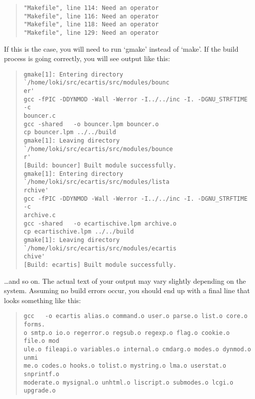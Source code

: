 \documentclass{book}
\begin{document}
\begin{quote}
\footnotesize
\begin{verbatim}
"Makefile", line 114: Need an operator
"Makefile", line 116: Need an operator
"Makefile", line 118: Need an operator
"Makefile", line 129: Need an operator
\end{verbatim}
\end{quote}

If this is the case, you will need to run `gmake' instead of `make'.  If the
build process is going correctly, you will see output like this:
   
\begin{quote}
\footnotesize
\begin{verbatim}
gmake[1]: Entering directory `/home/loki/src/ecartis/src/modules/bounc
er'
gcc -fPIC -DDYNMOD -Wall -Werror -I../../inc -I. -DGNU_STRFTIME   -c 
bouncer.c
gcc -shared   -o bouncer.lpm bouncer.o
cp bouncer.lpm ../../build
gmake[1]: Leaving directory `/home/loki/src/ecartis/src/modules/bounce
r'
[Build: bouncer] Built module successfully.
gmake[1]: Entering directory `/home/loki/src/ecartis/src/modules/lista
rchive'
gcc -fPIC -DDYNMOD -Wall -Werror -I../../inc -I. -DGNU_STRFTIME   -c 
archive.c
gcc -shared   -o ecartischive.lpm archive.o
cp ecartischive.lpm ../../build
gmake[1]: Leaving directory `/home/loki/src/ecartis/src/modules/ecartis
chive'
[Build: ecartis] Built module successfully.
\end{verbatim}
\end{quote}

\ldots and so on.  The actual text of your output may vary slightly depending
on the system.  Assuming no build errors occur, you should end up with a final
line that looks something like this:
   
\begin{quote} 
\footnotesize
\begin{verbatim}
gcc   -o ecartis alias.o command.o user.o parse.o list.o core.o forms.
o smtp.o io.o regerror.o regsub.o regexp.o flag.o cookie.o file.o mod
ule.o fileapi.o variables.o internal.o cmdarg.o modes.o dynmod.o unmi
me.o codes.o hooks.o tolist.o mystring.o lma.o userstat.o snprintf.o 
moderate.o mysignal.o unhtml.o liscript.o submodes.o lcgi.o upgrade.o
\end{verbatim}
\end{quote}
\end{document}
